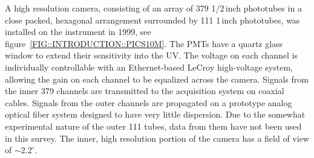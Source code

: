 A high resolution camera, consisting of an array of 379 1/2\,inch
phototubes in a close packed, hexagonal arrangement surrounded by 111
1\,inch phototubes, was installed on the instrument in 1999, see
figure~\ref{FIG::INTRODUCTION::PICS10M}. The PMTs have a quartz glass
window to extend their sensitivity into the UV. The voltage on each
channel is individually controllable with an Ethernet-based LeCroy
high-voltage system, allowing the gain on each channel to be equalized
across the camera. Signals from the inner 379 channels are transmitted
to the acquisition system on coaxial cables. Signals from the outer
channels are propagated on a prototype analog optical fiber system
designed to have very little dispersion. Due to the somewhat
experimental nature of the outer 111 tubes, data from them have not
been used in this survey. The inner, high resolution portion of the
camera has a field of view of $\sim2.2^\circ$.

